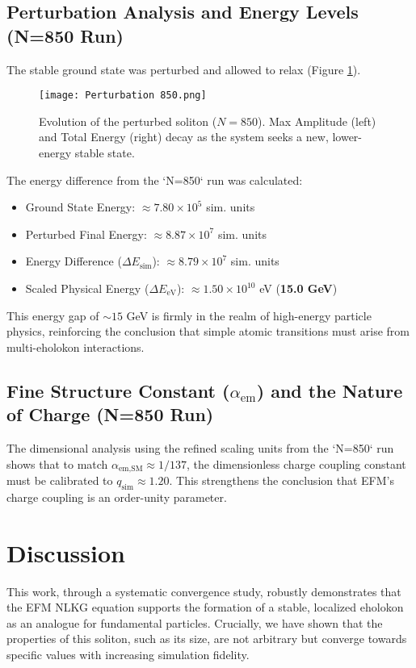 \documentclass[11pt]{article}
\begin{document}
\subsection{Perturbation Analysis and Energy Levels (N=850 Run)}
The stable ground state was perturbed and allowed to relax (Figure \ref{fig:perturbed_evolution}).
\begin{figure}[htbp]
    \centering
    \texttt{[image: Perturbation 850.png]}
    \caption{Evolution of the perturbed soliton (\(N=850\)). Max Amplitude (left) and Total Energy (right) decay as the system seeks a new, lower-energy stable state.}
    \label{fig:perturbed_evolution}
\end{figure}
The energy difference from the `N=850` run was calculated:
\begin{itemize}
    \item Ground State Energy: \( \approx 7.80 \times 10^5 \) sim. units
    \item Perturbed Final Energy: \( \approx 8.87 \times 10^7 \) sim. units
    \item Energy Difference (\(\Delta E_{\text{sim}}\)): \( \approx 8.79 \times 10^7 \) sim. units
    \item Scaled Physical Energy (\(\Delta E_{\text{eV}}\)): \( \approx 1.50 \times 10^{10} \) eV (\textbf{15.0 GeV})
\end{itemize}
This energy gap of \(\sim 15\) GeV is firmly in the realm of high-energy particle physics, reinforcing the conclusion that simple atomic transitions must arise from multi-eholokon interactions.

\subsection{Fine Structure Constant (\(\alpha_{\text{em}}\)) and the Nature of Charge (N=850 Run)}
The dimensional analysis using the refined scaling units from the `N=850` run shows that to match \(\alpha_{\text{em,SM}} \approx 1/137\), the dimensionless charge coupling constant must be calibrated to \textbf{\(q_{\text{sim}} \approx 1.20\)}. This strengthens the conclusion that EFM's charge coupling is an order-unity parameter.

\section{Discussion}
This work, through a systematic convergence study, robustly demonstrates that the EFM NLKG equation supports the formation of a stable, localized eholokon as an analogue for fundamental particles. Crucially, we have shown that the properties of this soliton, such as its size, are not arbitrary but converge towards specific values with increasing simulation fidelity.
\end{document}
